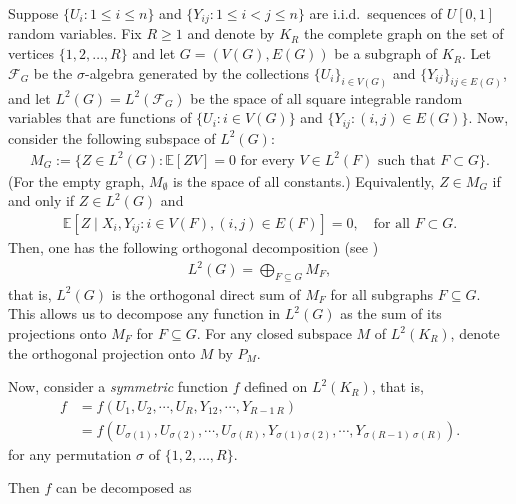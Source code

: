\documentclass[11pt,reqno]{amsart}
\numberwithin{equation}{section}
\theoremstyle{definition}
\begin{document}
Suppose $\{U_{i}: 1 \leq i \leq n\}$ and $\{Y_{ij}: 1\leq i<j \leq n\}$ are
i.i.d.\ sequences of $U[0,1]$ random variables. Fix $R \geq 1$ and denote by $K_R$ the complete
graph on the set of vertices $\{1, 2, \ldots, R\}$ and let $G= (V(G), E(G))$
be a subgraph of $K_{R}$. Let $\mathcal{F}_{G}$ be the $\sigma$-algebra
generated by the collections $\{U_{i}\}_{i\in V(G)}$ and $\{Y_{ij}\}_{ij\in E(G)}$,
and let $L^{2}(G)=L^2(\mathcal{F}_G)$ 
be the space of all square integrable random
variables that are functions of $\{U_{i}: i\in V(G)\}$ and $\{Y_{ij}:
(i,j)\in E(G) \}$. Now, consider the following subspace of $L^{2}(G)$: 
\begin{align}\label{eq:def-MG}
M_{G}:=\{Z\in L^{2}(G) : \mathbb{E}[ZV]=0\text{ for every }V\in L^{2}(F)\text{ such that } F \subset G\}. 
\end{align}
(For the empty graph, $M_{\emptyset}$ is the space of all constants.) 
Equivalently,
$Z\in M_{G}$ if and only if $Z\in L^{2}(G)$ and 
\begin{align*}
\mathbb{E}\left[Z\mid X_{i},Y_{ij}: i \in V(F), (i, j) \in E(F)\right] = 0,
\quad \text{for all } F \subset G.
\end{align*}
Then, one has the following orthogonal decomposition (see \cite[Lemma 1]{janson1991asymptotic})  
\begin{align}\label{eq:LGH}
L^{2}(G)=\bigoplus_{F \subseteq G} M_F, 
\end{align}
that is, $L^{2}(G)$ is the orthogonal direct sum of $M_{F}$ for all 
subgraphs $F\subseteq G$. This allows us to decompose 
 any function in $L^{2}(G)$ as the sum of  its
projections onto $M_{F}$ for $F \subseteq G$. For any closed subspace $M$ of $L^2(K_R)$, denote the orthogonal projection onto $M$ by $P_M$.

Now, consider a {\it symmetric} function $f$ defined on $L^2(K_R)$, that is, 
\begin{align}\label{eq:def-f-general}
    f & = f(U_{1},U_{2},\cdots, U_{R}, Y_{12}, \cdots, Y_{R-1~R}) \nonumber \\ 
    &= f(U_{\sigma(1)}, U_{\sigma(2)},\cdots, U_{\sigma(R)}, Y_{\sigma(1) \sigma(2)}, \cdots, Y_{\sigma(R-1)~\sigma(R)}) . 
\end{align}
for any permutation $\sigma$ of $\{1, 2, \ldots, R\}$. 

Then $f$ can be decomposed as  
\end{document}
